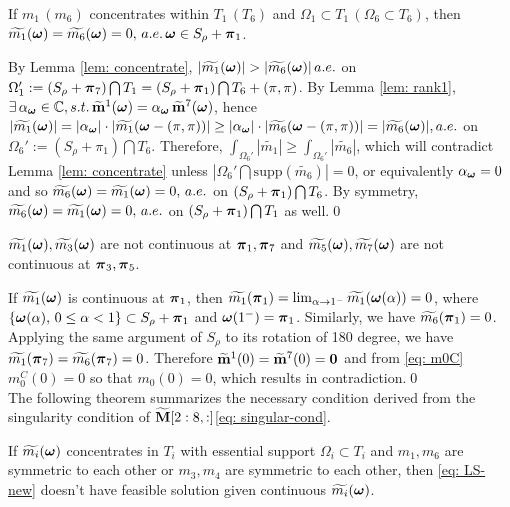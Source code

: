 \begin{proposition}
If  $m_1\,(m_6)$ concentrates within $T_1\,(T_6)$ and $\Omega_1\subset T_1\,(\Omega_6\subset T_6)$, then $\widetilde{m_{1}}(\boldsymbol{\omega}) = \widetilde{m_{6}}(\boldsymbol{\omega}) = 0,\, a.e. \,\boldsymbol{\omega}\in S_\rho + \boldsymbol{\pi}_1$.
\end{proposition}
By Lemma \ref{lem: concentrate}, $|\widetilde{m_{1}}(\boldsymbol{\omega})| > |\widetilde{m_{6}}(\boldsymbol{\omega})|\, a.e.$ on $\Omega_1':= (S_\rho + \boldsymbol{\pi}_7)\bigcap T_1 = (S_\rho+\boldsymbol{\pi}_1)\bigcap T_6+(\pi,\pi)$. By Lemma \ref{lem: rank1}, $\exists\,\alpha_{\boldsymbol{\omega}}\in\mathbb{C}, s.t.\,\widetilde{\mathbf{m}}^{1}(\boldsymbol{\omega}) = \alpha_{\boldsymbol{\omega}}\,\widetilde{\mathbf{m}}^{7}(\boldsymbol{\omega})$, hence $|\widetilde{m_1}(\boldsymbol{\omega})| = |\alpha_{\boldsymbol{\omega}}|\cdot|\widetilde{m_1}(\boldsymbol{\omega}-(\pi,\pi))| \geq |\alpha_{\boldsymbol{\omega}}|\cdot|\widetilde{m_6}(\boldsymbol{\omega}-(\pi,\pi))| = |\widetilde{m_{6}}(\boldsymbol{\omega})|, a.e. $ on $\Omega_6':= (S_\rho+\pi_1)\bigcap T_6$. Therefore, $\int_{\Omega_6'}|\widetilde{m_1}| \geq \int_{\Omega_6'}|\widetilde{m_6}|$, which will contradict Lemma \ref{lem: concentrate} unless $|\Omega_6'\bigcap\text{supp}(\widetilde{m_6})| = 0$, or equivalently $\alpha_{\boldsymbol{\omega}}=0$ and so $\widetilde{m_{6}}(\boldsymbol{\omega}) = \widetilde{m_{1}}(\boldsymbol{\omega}) = 0,\,a.e.$ on $(S_\rho+\boldsymbol{\pi}_1)\bigcap T_6$. By symmetry, $\widetilde{m_{6}}(\boldsymbol{\omega})=\widetilde{m_{1}}(\boldsymbol{\omega}) = 0,\,a.e. $ on $(S_\rho+\boldsymbol{\pi}_1)\bigcap T_1$ as well.\qed

\begin{proposition}
$\widetilde{m_{1}}(\boldsymbol{\omega}),\widetilde{m_{3}}(\boldsymbol{\omega})$ are not continuous at $\boldsymbol{\pi}_1,\boldsymbol{\pi}_7$ and $\widetilde{m_{5}}(\boldsymbol{\omega}),\widetilde{m_{7}}(\boldsymbol{\omega})$ are not continuous at $\boldsymbol{\pi}_3,\boldsymbol{\pi}_5$.
\end{proposition}
If $\widetilde{m_{1}}(\boldsymbol{\omega})$ is continuous at $\boldsymbol{\pi}_1$, then $\widetilde{m_1}(\boldsymbol{\pi}_1) = \lim_{\alpha\rightarrow 1^-}\widetilde{m_1}(\boldsymbol{\omega}(\alpha)) = 0$, where $\{\boldsymbol{\omega}(\alpha),\,0\leq \alpha<1\} \subset S_\rho + \boldsymbol{\pi}_1$ and $\boldsymbol{\omega}(1^-) = \boldsymbol{\pi}_1$. Similarly, we have $\widetilde{m_6}(\boldsymbol{\pi}_1) = 0$. Applying the same argument of $S_\rho$ to its rotation of 180 degree, we have $\widetilde{m_1}(\boldsymbol{\pi}_7) = \widetilde{m_6}(\boldsymbol{\pi}_7) = 0$. Therefore $\widetilde{\mathbf{m}}^{1}(0) = \widetilde{\mathbf{m}}^{7}(0) = \mathbf{0}$ and from \eqref{eq: m0C} $m_0^C(0)=0$ so that $m_0(0)=0$, %
 which results in contradiction.\qed\\[1em]
The following theorem summarizes the necessary condition derived from the singularity condition of $\widetilde{\mathbf{M}}[2:8,:] $\eqref{eq: singular-cond}. 
\begin{theorem}\label{thm: thm}
If  $\widetilde{m_{i}}(\boldsymbol{\omega})$ concentrates in $T_i$ with essential support $\Omega_i\subset T_i$ and $m_1,m_6$ are symmetric to each other or $m_3,m_4$ are symmetric to each other,  then  \eqref{eq: LS-new} doesn't have feasible solution given continuous $\widetilde{m_{i}}(\boldsymbol{\omega})$.
\end{theorem}

